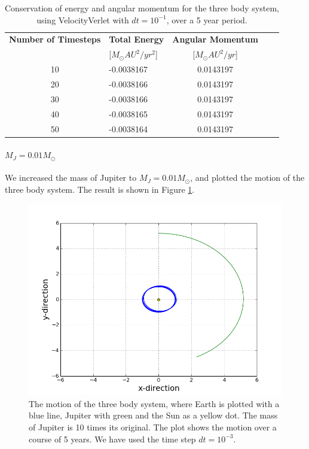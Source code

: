 \documentclass[norsk,a4paper,12pt]{article}
\begin{document}
{\begin{table} [H]
\centering
\caption{Conservation of energy and angular momentum for the three body system, using VelocityVerlet with $dt=10^{-1}$, over a 5 year period.}
\begin{tabularx}{\textwidth}{cXcXc} \toprule
    {\bf Number of Timesteps} & {\bf Total Energy }& {\bf Angular Momentum} \\
    &[$M_\odot AU^2/yr^2$]&[$M_\odot AU^2/yr$]\\ \hline
    10 & -0.0038167 & 0.0143197\\ \hline
    20 & -0.0038166 & 0.0143197\\ \hline
    30 & -0.0038166 & 0.0143197\\ \hline
    40 & -0.0038165 & 0.0143197\\ \hline
    50 & -0.0038164 & 0.0143197\\ \bottomrule 
\end{tabularx}
\label{threebody_energy_dt=10(-1)}
\end{table}

\paragraph{\textbf{$M_J = 0.01M_{\odot}$}}

We increased the mass of Jupiter to $M_J = 0.01M_{\odot}$, and plotted the motion of the three body system. The result is shown in Figure \ref{fig:Jupiter_m=10^(-2)_Earth}.

\begin{figure} [H]
    \centering
    \includegraphics[scale=0.6]{oppg_3e_threebody_Jupiter_m=10_(-2)_Earth}
    \caption{The motion of the three body system, where Earth is plotted with a blue line, Jupiter with green and the Sun as a yellow dot. The mass of Jupiter is 10 times its original. The plot shows the motion over a course of 5 years. We have used the time step $dt = 10^{-3}$.}
    \label{fig:Jupiter_m=10^(-2)_Earth}
\end{figure}

}
\end{document}
